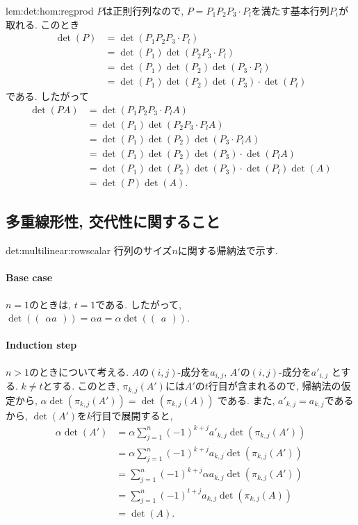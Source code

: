 \begin{proofof*}{lem:det:hom:reg}{prod}
  $P$は正則行列なので, $P=P_1P_2P_3\cdot P_l$を満たす基本行列$P_i$が取れる.
  このとき
  \begin{align*}
    \det(P)
    &=\det(P_1P_2P_3\cdot P_l)\\
    &=\det(P_1)\det(P_2P_3\cdot P_l)\\
    &=\det(P_1)\det(P_2)\det(P_3\cdot P_l)\\
    &=\det(P_1)\det(P_2)\det(P_3)\cdot \det(P_l)
  \end{align*}
  である.  したがって
  \begin{align*}
    \det(PA)
    &=\det(P_1P_2P_3\cdot P_l A)\\
    &=\det(P_1)\det(P_2P_3\cdot P_lA)\\
    &=\det(P_1)\det(P_2)\det(P_3\cdot P_l A)\\
    &=\det(P_1)\det(P_2)\det(P_3)\cdot \det(P_l A)\\
    &=\det(P_1)\det(P_2)\det(P_3)\cdot \det(P_l)\det(A)\\
    &=\det(P)\det(A).
  \end{align*}
\end{proofof*}

\subsection{多重線形性, 交代性に関すること}

\begin{proofof*}{det:multilinear:row}{scalar}
  行列のサイズ$n$に関する帰納法で示す.
  \paragraph{Base case}
  $n=1$のときは,
  $t=1$である.
  したがって,
  $\det(\begin{pmatrix}\alpha a\end{pmatrix})=\alpha a=\alpha \det(\begin{pmatrix}a\end{pmatrix})$.
  \paragraph{Induction step}
  $n>1$のときについて考える.
  $A$の$(i,j)$-成分を$a_{i,j}$,
  $A'$の$(i,j)$-成分を$a'_{i,j}$
  とする.
  $k\neq t$とする.
  このとき,
  $\pi_{k,j}(A')$には$A'$の$t$行目が含まれるので,
  帰納法の仮定から,
  $\alpha\det(\pi_{k,j}(A'))=\det(\pi_{k,j}(A))$
  である.
  また, $a'_{k,j}=a_{k,j}$であるから,
  $\det(A')$を$k$行目で展開すると,
  \begin{align*}
    \alpha\det(A')
    &=\alpha\sum_{j=1}^{n} (-1)^{k+j} a'_{k,j}\det(\pi_{k,j}(A'))\\
    &=\alpha\sum_{j=1}^{n} (-1)^{k+j} a_{k,j}\det(\pi_{k,j}(A'))\\
    &=\sum_{j=1}^{n} (-1)^{k+j} \alpha a_{k,j}\det(\pi_{k,j}(A'))\\
    &=\sum_{j=1}^{n} (-1)^{t+j} a_{k,j}\det(\pi_{k,j}(A))\\
    &=\det(A).
  \end{align*}
\end{proofof*}

